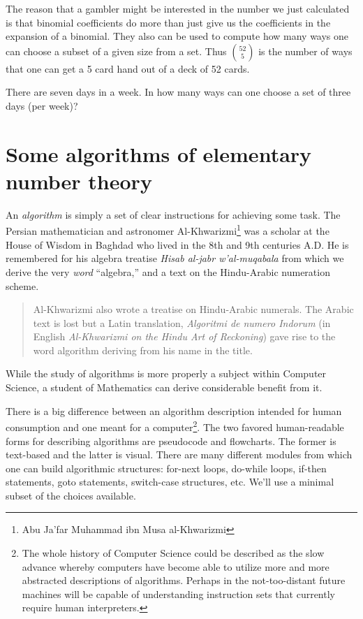 The reason that a gambler might be interested in the number we just calculated
is that binomial coefficients do more than just give us the coefficients in the
expansion of a binomial.  They also can be used to compute how many ways one
can choose a subset of a given size from a set.  Thus $\binom{52}{5}$ is the
number of ways that one can get a 5 card hand out of a deck of 52 cards.  

\begin{exer}
There are seven days in a week.  In how many ways can one choose a set
of three days (per week)?
\end{exer}

\newpage




\newpage

\section[Some algorithms]{Some algorithms of elementary number theory}
\label{sec:alg}

An \emph{algorithm} is simply a set of clear 
instructions for achieving
some task.  The Persian mathematician and astronomer
Al-Khwarizmi\footnote{Abu Ja'far Muhammad ibn Musa al-Khwarizmi} was a
scholar at the House of Wisdom in Baghdad who lived in the 8th and 9th
centuries A.D.   He is remembered for his algebra treatise \emph{Hisab
  al-jabr w'al-muqabala} from which we derive the very {\em word}
``algebra,'' and a text on the Hindu-Arabic numeration scheme.

\begin{quote}
Al-Khwarizmi also wrote a treatise on Hindu-Arabic numerals.  The
Arabic text is lost but a Latin translation, {\em Algoritmi de numero
Indorum} (in English {\em Al-Khwarizmi on the Hindu Art of Reckoning}) gave
rise to the word algorithm deriving from his name in the
title.~\cite{HisMathArch} 
\end{quote}

While the study of algorithms is more properly a subject within
Computer Science, a student of Mathematics can derive considerable
benefit from it.  

There is a big difference between an algorithm description intended
for human consumption and one meant for a computer\footnote{The 
whole history of Computer Science could be
  described as the slow advance whereby computers have become  able to
  utilize more and more abstracted descriptions of algorithms. 
  Perhaps in the not-too-distant future machines will be capable of
  understanding instruction sets that currently require human interpreters.}.  
The two favored human-readable forms for describing
algorithms are  pseudocode and  
flowcharts.  The former is text-based
and the latter is visual.  There are many different modules from which
one can build algorithmic structures: for-next loops, do-while loops, if-then
statements, goto statements, switch-case structures, etc.   We'll use
a minimal subset of the choices available.

